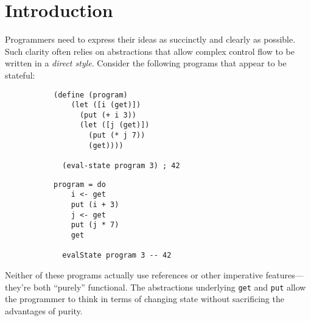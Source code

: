 \documentclass[acmsmall, nonacm]{acmart}
\begin{document}
\section{Introduction} \label{sec:introduction}
Programmers need to express their ideas as succinctly and clearly as possible. Such clarity often
relies on abstractions that allow complex control flow to be written in a {\em direct style}.
Consider the following programs that appear to be stateful:
\begin{figure}[H]
\centering
\begin{subfigure}{.5\textwidth}
  \centering
  \begin{lstlisting}[style=rkt]
  (define (program)
    (let ([i (get)])
      (put (+ i 3))
      (let ([j (get)])
        (put (* j 7))
        (get))))

  (eval-state program 3) ; 42
  \end{lstlisting}
  \label{fig:racket-state}
\end{subfigure}%
\begin{subfigure}{.5\textwidth}
  \centering
  \begin{lstlisting}[style=hs]
  program = do
    i <- get
    put (i + 3)
    j <- get
    put (j * 7)
    get

  evalState program 3 -- 42
  \end{lstlisting}
  \label{fig:hs-state}
\end{subfigure}
\label{fig:stateful-comps}
\end{figure}
\noindent Neither of these programs actually use references or other imperative
features---they're both ``purely'' functional. The abstractions underlying {\tt get} and {\tt put}
allow the programmer to think in terms of changing state without sacrificing the advantages of
purity.
\end{document}
